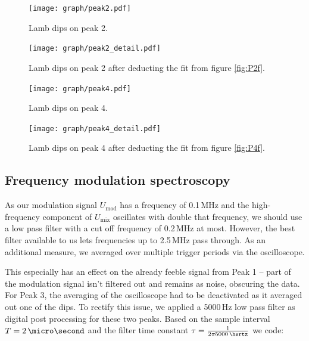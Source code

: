 \begin{figure}[p]
	\centering
	\texttt{[image: graph/peak2.pdf]}
	\vspace{-1ex}
	\caption{Lamb dips on peak 2.}
	\label{fig:P2f}
	\vspace{2ex}

	\texttt{[image: graph/peak2\_detail.pdf]}
	\vspace{-1ex}
	\caption{Lamb dips on peak 2 after deducting the fit from figure \ref{fig:P2f}.}
	\label{fig:P2}
	\vspace{-2em}
\end{figure}

\begin{figure}[p]
	\centering
	\texttt{[image: graph/peak4.pdf]}
	\vspace{-1ex}
	\caption{Lamb dips on peak 4.}
	\label{fig:P4f}
	\vspace{2ex}

	\texttt{[image: graph/peak4\_detail.pdf]}
	\vspace{-1ex}
	\caption{Lamb dips on peak 4 after deducting the fit from figure \ref{fig:P4f}.}
	\label{fig:P4}
	\vspace{-2em}
\end{figure}

\newpage
\subsection{Frequency modulation spectroscopy}

As our modulation signal $U_\text{mod}$ has a frequency of 0.1\,MHz and the high-frequency component of $U_\text{mix}$ oscillates with double that frequency, we should use a low pass filter with a cut off frequency of 0.2\,MHz at most. However,  the best filter available to us lets frequencies  up to 2.5\,MHz pass through. As an additional measure, we averaged over multiple trigger periods via the oscilloscope.

This especially has an effect on the already feeble signal from Peak 1 -- part of the modulation signal isn't filtered out and remains as noise, obscuring the data. For Peak 3, the averaging of the oscilloscope had to be deactivated as it averaged out one of the dips.
To rectify this issue, we applied a 5000\,Hz low pass filter as digital post processing for these two peaks. Based on the sample interval $T = 2\,\micro\second$ and the filter time constant $\tau = \frac{1}{2 \pi \cdt 5000\,\hertz}$ we code:



